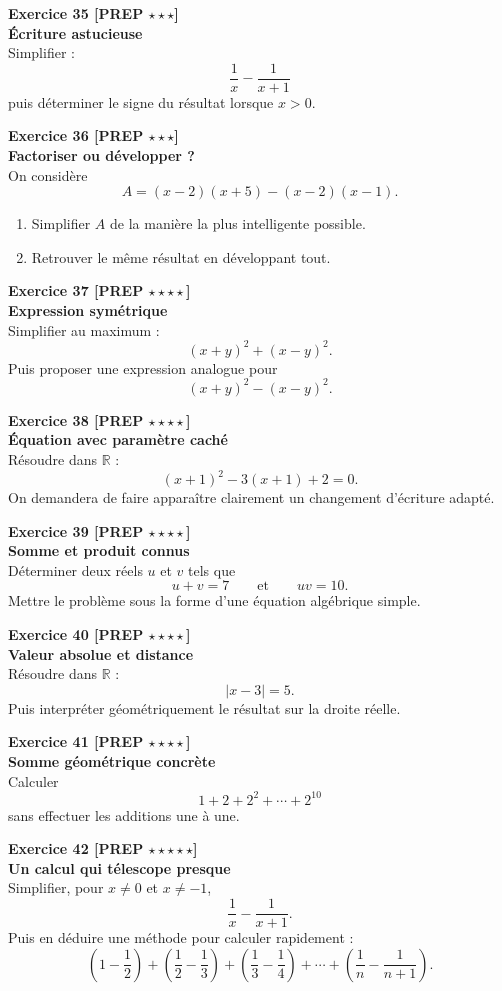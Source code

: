 \documentclass[11pt,a4paper]{article}
\begin{document}
\textbf{Exercice 35 [PREP $\star\star\star$]}\\
\textbf{Écriture astucieuse}\\
Simplifier :
\[
\frac{1}{x}-\frac{1}{x+1}
\]
puis déterminer le signe du résultat lorsque $x>0$.

\textbf{Exercice 36 [PREP $\star\star\star$]}\\
\textbf{Factoriser ou développer ?}\\
On considère
\[
A=(x-2)(x+5)-(x-2)(x-1).
\]
\begin{enumerate}[label=\alph*)]
    \item Simplifier $A$ de la manière la plus intelligente possible.
    \item Retrouver le même résultat en développant tout.
\end{enumerate}

\textbf{Exercice 37 [PREP $\star\star\star\star$]}\\
\textbf{Expression symétrique}\\
Simplifier au maximum :
\[
(x+y)^2+(x-y)^2.
\]
Puis proposer une expression analogue pour
\[
(x+y)^2-(x-y)^2.
\]

\textbf{Exercice 38 [PREP $\star\star\star\star$]}\\
\textbf{Équation avec paramètre caché}\\
Résoudre dans $\mathbb{R}$ :
\[
(x+1)^2-3(x+1)+2=0.
\]
On demandera de faire apparaître clairement un changement d’écriture adapté.

\textbf{Exercice 39 [PREP $\star\star\star\star$]}\\
\textbf{Somme et produit connus}\\
Déterminer deux réels $u$ et $v$ tels que
\[
u+v=7 \qquad \text{et} \qquad uv=10.
\]
Mettre le problème sous la forme d’une équation algébrique simple.

\textbf{Exercice 40 [PREP $\star\star\star\star$]}\\
\textbf{Valeur absolue et distance}\\
Résoudre dans $\mathbb{R}$ :
\[
|x-3|=5.
\]
Puis interpréter géométriquement le résultat sur la droite réelle.

\textbf{Exercice 41 [PREP $\star\star\star\star$]}\\
\textbf{Somme géométrique concrète}\\
Calculer
\[
1+2+2^2+\cdots+2^{10}
\]
sans effectuer les additions une à une.

\textbf{Exercice 42 [PREP $\star\star\star\star\star$]}\\
\textbf{Un calcul qui télescope presque}\\
Simplifier, pour $x\neq 0$ et $x\neq -1$,
\[
\frac{1}{x}-\frac{1}{x+1}.
\]
Puis en déduire une méthode pour calculer rapidement :
\[
\left(1-\frac12\right)+\left(\frac12-\frac13\right)+\left(\frac13-\frac14\right)+\cdots+\left(\frac1n-\frac1{n+1}\right).
\]
\end{document}
